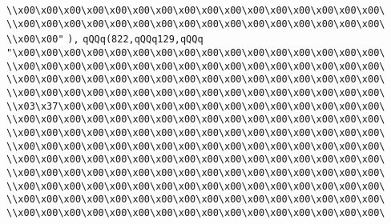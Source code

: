 \verb|\\x00\x00\x00\x00\x00\x00\x00\x00\x00\x00\x00\x00\x00\x00\x00\x00\|\newline
\verb|\\x00\x00\x00\x00\x00\x00\x00\x00\x00\x00\x00\x00\x00\x00\x00\x00\|\newline
\verb|\\x00\x00"|\newline
\verb|),|\newline
\verb|qQQq(822,qQQq129,qQQq|\newline
\verb|"\x00\x00\x00\x00\x00\x00\x00\x00\x00\x00\x00\x00\x00\x00\x00\x00\|\newline
\verb|\\x00\x00\x00\x00\x00\x00\x00\x00\x00\x00\x00\x00\x00\x00\x00\x00\|\newline
\verb|\\x00\x00\x00\x00\x00\x00\x00\x00\x00\x00\x00\x00\x00\x00\x00\x00\|\newline
\verb|\\x00\x00\x00\x00\x00\x00\x00\x00\x00\x00\x00\x00\x00\x00\x00\x00\|\newline
\verb|\\x03\x37\x00\x00\x00\x00\x00\x00\x00\x00\x00\x00\x00\x00\x00\x00\|\newline
\verb|\\x00\x00\x00\x00\x00\x00\x00\x00\x00\x00\x00\x00\x00\x00\x00\x00\|\newline
\verb|\\x00\x00\x00\x00\x00\x00\x00\x00\x00\x00\x00\x00\x00\x00\x00\x00\|\newline
\verb|\\x00\x00\x00\x00\x00\x00\x00\x00\x00\x00\x00\x00\x00\x00\x00\x00\|\newline
\verb|\\x00\x00\x00\x00\x00\x00\x00\x00\x00\x00\x00\x00\x00\x00\x00\x00\|\newline
\verb|\\x00\x00\x00\x00\x00\x00\x00\x00\x00\x00\x00\x00\x00\x00\x00\x00\|\newline
\verb|\\x00\x00\x00\x00\x00\x00\x00\x00\x00\x00\x00\x00\x00\x00\x00\x00\|\newline
\verb|\\x00\x00\x00\x00\x00\x00\x00\x00\x00\x00\x00\x00\x00\x00\x00\x00\|\newline
\verb|\\x00\x00\x00\x00\x00\x00\x00\x00\x00\x00\x00\x00\x00\x00\x00\x00\|\newline

